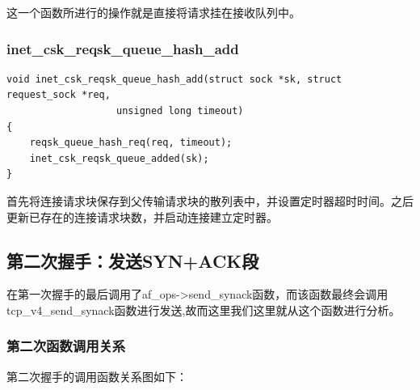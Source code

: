                 这一个函数所进行的操作就是直接将请求挂在接收队列中。

            \subsubsection{inet\_csk\_reqsk\_queue\_hash\_add}

\begin{verbatim}
void inet_csk_reqsk_queue_hash_add(struct sock *sk, struct request_sock *req,
                   unsigned long timeout)
{
    reqsk_queue_hash_req(req, timeout);
    inet_csk_reqsk_queue_added(sk);
}
\end{verbatim}

                首先将连接请求块保存到父传输请求块的散列表中，并设置定时器超时时间。之后更新已存在的连接请求块数，并启动连接建立定时器。

        \subsection{第二次握手：发送SYN+ACK段}
            在第一次握手的最后调用了af\_ops->send\_synack函数，而该函数最终会调用tcp\_v4\_send\_synack函数进行发送,故而这里我们这里就从这个函数进行分析。
            \subsubsection{第二次函数调用关系}            
                第二次握手的调用函数关系图如下：
                \begin{figure}[htb]        
                \end{figure}   
